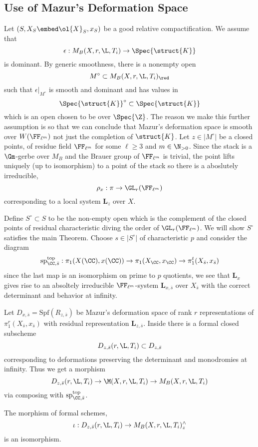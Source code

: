 \documentclass{article}
\newcommand{\LL}{\mathbf{L}}
\newcommand{\Spf}[1]{\mathrm{Spf}\left( #1 \right)}
\renewcommand{\top}{\mathrm{top}}
\begin{document}
\subsection{Use of Mazur's Deformation Space}

Let $(S, X_S \embed \ol{X}_S, x_S)$ be a good relative compactification. We assume that
\[ \epsilon : M_B(X, r, \L, T_i) \to \Spec{\struct{K}} \]
is dominant. By generic smoothness, there is a nonempty open
\[ M^\circ \subset M_B(X, r, \L, T_i)_{\red} \]
such that $\epsilon|_{M^\circ}$ is smooth and dominant and has values in
\[ \Spec{\struct{K}}^\circ \subset \Spec{\struct{K}} \]
which is an open chosen to be \etale over $\Spec{\Z}$. The reason we make this further assumption is so that we can conclude that Mazur's deformation space is smooth over $W(\FF_{\ell^m})$ not just the completion of $\struct{K}$. Let $z \in |M^\circ|$ be a closed points, of residue field $\FF_{\ell^m}$ for some $\ell \ge 3$ and $m \in \N_{>0}$. Since the stack is a $\Gm$-gerbe over $M_B$ and the Brauer group of $\FF_{\ell^m}$ is trivial, the point lifts uniquely (up to isomorphism) to a point of the stack so there is a aboslutely irreducible,
\[ \rho_x : \pi \to \GL_r(\FF_{\ell^m}) \]
corresponding to a local system $\LL_z$ over $X$. 
\par 
Define $S^\circ \subset S$ to be the non-empty open which is the complement of the closed points of residual characteristic diving the order of $\GL_r(\FF_{\ell^m})$. We will show $S^\circ$ satisfies the main Theorem. Choose $s \in |S^\circ|$ of characteristic $p$ and consider the diagram
\[ \sp^{\top}_{\CC,\bar{s}} : \pi_1(X(\CC), x(\CC)) \to \pi_1(X_{\CC}, x_{\CC}) \to \pi_1^t(X_{\bar{s}}, x_{\bar{s}}) \]
since the last map is an isomorphism on prime to $p$ quotients, we see that $\LL_{x}$ gives rise to an absoltely irreducible $\FF_{\ell^m}$-system $\LL_{x,\bar{s}}$ over $X_{\bar{s}}$ with the correct determinant and behavior at infinity.
\par 
Let $D_{x,\bar{s}} = \Spf{R_{z, \bar{s}}}$ be Mazur's deformation space of rank $r$ representations of $\pi_1^r(X_{\bar{s}}, x_{\bar{s}})$ with residual representation $\LL_{z, \bar{s}}$. Inside there is a formal closed subscheme
\[ D_{z, \bar{s}}(r, \L, T_i) \subset D_{z, \bar{s}} \]
corresponding to deformations preserving the determinant and monodromies at infinity. Thus we get a morphism
\[ D_{z, \bar{s}}(r, \L, T_i) \to \M(X, r, \L, T_i) \to M_B(X, r, \L, T_i) \]
via composing with $\sp_{\CC, \bar{s}}^{\top}$.

\begin{prop}
The morphism of formal schemes,
\[ \iota : D_{z, \bar{s}}(r, \L, T_i) \to M_B(X, r, \L, T_i)_z^{\wedge} \]
is an isomorphism.
\end{prop}
\end{document}
